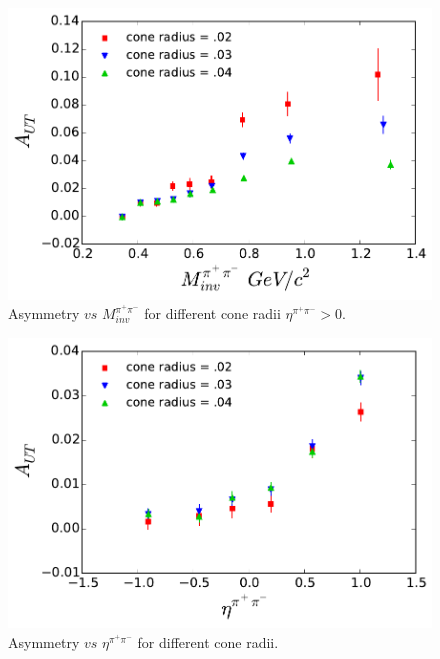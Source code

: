 \documentclass[letterpaper, abstract = on,listof=totoc, bibliography=totoc]{scrreprt}
\newcommand{\mpair}{M_{inv}^{\pi^+\pi^-}}
\newcommand{\etapair}{\eta^{\pi^+\pi^-}}
\begin{document}
\begin{figure}
\begin{center}
\includegraphics[width = .8\textwidth]{allConeAsymsVs_Mass_8_24_15_HiEta}
\caption[Asymmetry $vs$ $\mpair$ for different cone radii.]{Asymmetry $vs$ $\mpair$ for different cone radii $\etapair > 0$.}
\label{fig:allConesMass}
\end{center}
\end{figure}

\begin{figure}
\begin{center}
\includegraphics[width = .8\textwidth]{allConeAsymsVs_Eta_8_24_15_FullEta}
\caption[Asymmetry $vs$ $\etapair$ for different cone radii.]{Asymmetry $vs$ $\etapair$ for different cone radii.}
\label{fig:allConesEta}
\end{center}
\end{figure}
\end{document}
